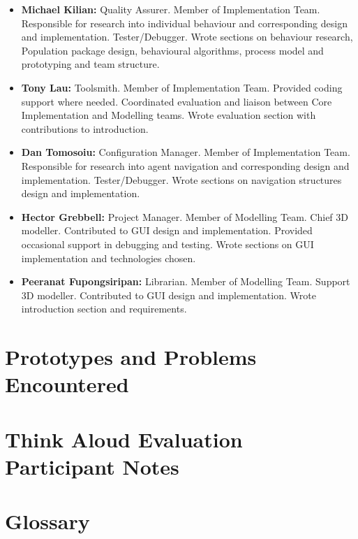 \documentclass{l3proj}
\begin{document}
\begin{itemize}
\item{\textbf{Michael Kilian:} Quality Assurer. Member of Implementation Team. Responsible for research into individual behaviour and corresponding design and implementation. Tester/Debugger. Wrote sections on behaviour research, Population package design, behavioural algorithms, process model and prototyping and team structure.}
\item{\textbf{Tony Lau:} Toolsmith. Member of Implementation Team. Provided coding support where needed. Coordinated evaluation and liaison between Core Implementation and Modelling teams. Wrote evaluation section with contributions to introduction. }
\item{\textbf{Dan Tomosoiu:} Configuration Manager. Member of Implementation Team. Responsible for research into agent navigation and corresponding design and implementation. Tester/Debugger. Wrote sections on navigation structures design and implementation.}
\item{\textbf{Hector Grebbell:} Project Manager. Member of Modelling Team. Chief 3D modeller. Contributed to GUI design and implementation. Provided occasional support in debugging and testing. Wrote sections on GUI implementation and technologies chosen.}
\item{\textbf{Peeranat Fupongsiripan:} Librarian. Member of Modelling Team. Support 3D modeller. Contributed to GUI design and implementation. Wrote introduction section and requirements. }
\end{itemize}

\clearpage
\appendix
{}


\chapter{Prototypes and Problems Encountered}


\chapter{Think Aloud Evaluation Participant Notes}



\chapter{Glossary}









\end{document}
